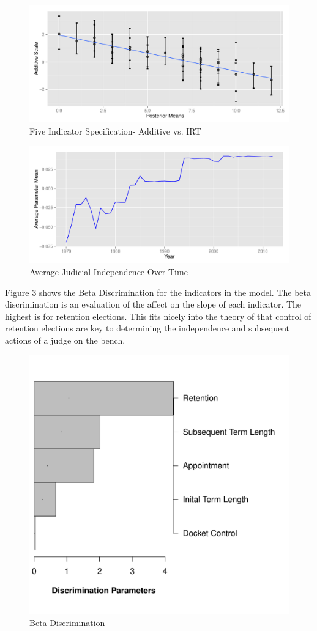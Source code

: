 \documentclass[12pt]{article}
\begin{document}
\begin{figure}
	\centering
	\caption{Five Indicator Specification- Additive vs. IRT}
	\label{fig:fiveind_additive_ggplot}
	\includegraphics[width=0.7\linewidth]{graphics/fiveind/fiveind_additive_ggplot}
\end{figure}

\begin{figure}[!tbh]
\centering
\caption{Average Judicial Independence Over Time}
\label{fig:meanavgtime}
\includegraphics[width=0.7\linewidth]{graphics/fiveind/meanavgtime}
\end{figure}

Figure \ref{fig:FiveBetaDiscrimination} shows the Beta Discrimination for the indicators in the model.  The beta discrimination is an evaluation of the affect on the slope of each indicator.  The highest is for retention elections.  This fits nicely into the theory of \citet{Choi2010} that control of retention elections are key to determining the independence and subsequent actions of a judge on the bench.

\begin{figure}[!tbh]
\centering
\caption{Beta Discrimination}
\label{fig:FiveBetaDiscrimination}
\includegraphics[width=0.7\linewidth]{graphics/fiveind/FiveBetaDiscrimination}
\end{figure}
\end{document}
